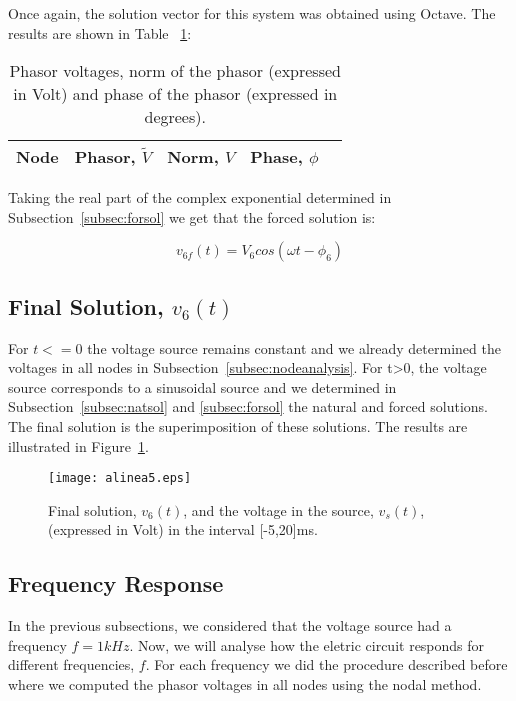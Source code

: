 Once again, the solution vector for this system was obtained using Octave. The results are shown in Table ~\ref{tab:phasortab}:

\begin{table}[H]
  \centering
  \begin{tabular}{|c|c|c|c|c}
    \hline    
    {\bf Node} & {\bf Phasor, $\widetilde{V}$} & {\bf Norm, $V$} & {\bf Phase, $\phi$} \\ \hline
    
  \end{tabular}
  \caption{Phasor voltages, norm of the phasor (expressed in Volt) and phase of the phasor (expressed in degrees).}
  \label{tab:phasortab}
\end{table}

Taking the real part of the complex exponential determined in Subsection~\ref{subsec:forsol} we get that the forced solution is:

\begin{equation}
  v_{6f}(t) = V_6 cos(\omega t - \phi_6)
\end{equation}


\subsection{Final Solution, $v_6(t)$} \label{subsec:finsol}

For $t<=0$ the voltage source remains constant and we already determined the voltages in all nodes in Subsection~\ref{subsec:nodeanalysis}. For t>0, the voltage source corresponds to a sinusoidal source and we determined in Subsection~\ref{subsec:natsol} and \ref{subsec:forsol} the natural and forced solutions. The final solution is the superimposition of these solutions. The results are illustrated in Figure~\ref{fig:finsol}.

\begin{figure}[H] \centering
\texttt{[image: alinea5.eps]}
\caption{Final solution, $v_{6}(t)$, and the voltage in the source, $v_s(t)$, (expressed in Volt) in the interval [-5,20]ms.}
\label{fig:finsol}
\end{figure}


\subsection{Frequency Response}

In the previous subsections, we considered that the voltage source had a frequency $f=1kHz$. Now, we will analyse how the eletric circuit responds for different frequencies, $f$. For each frequency we did the procedure described before where we computed the phasor voltages in all nodes using the nodal method.

